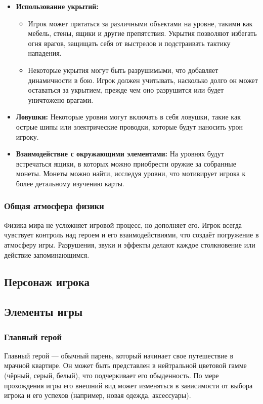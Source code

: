 \documentclass[12pt]{article}
\begin{document}
            \begin{itemize}
                \item \textbf{Использование укрытий:} 
                \begin{itemize}
                    \item Игрок может прятаться за различными объектами на уровне, такими как мебель, стены, ящики и другие препятствия. Укрытия позволяют избегать огня врагов, защищать себя от выстрелов и подстраивать тактику нападения.
                    \item Некоторые укрытия могут быть разрушимыми, что добавляет динамичности в бою. Игрок должен учитывать, насколько долго он может оставаться за укрытием, прежде чем оно разрушится или будет уничтожено врагами.
                \end{itemize}
                
                \item \textbf{Ловушки:} 
                    Некоторые уровни могут включать в себя ловушки, такие как острые шипы или электрические проводки, которые будут наносить урон игроку.
                \item \textbf{Взаимодействие с окружающими элементами:}
                        На уровнях будут встречаться ящики, в которых можно приобрести оружие за собранные монеты. Монеты можно найти, исследуя уровни, что мотивирует игрока к более детальному изучению карты.
            \end{itemize}

        
        \subsubsection{Общая атмосфера физики}
        
        Физика мира не усложняет игровой процесс, но дополняет его. Игрок всегда чувствует контроль над героем и его взаимодействиями, что создаёт погружение в атмосферу игры. Разрушения, звуки и эффекты делают каждое столкновение или действие запоминающимся.

    \subsection{Персонаж игрока}
    \subsection{Элементы игры}
    \subsubsection{Главный герой}
Главный герой — обычный парень, который начинает свое путешествие в мрачной квартире. Он может быть представлен в нейтральной цветовой гамме (чёрный, серый, белый), что подчеркивает его обыденность. По мере прохождения игры его внешний вид может изменяться в зависимости от выбора игрока и его успехов (например, новая одежда, аксессуары).
\end{document}
